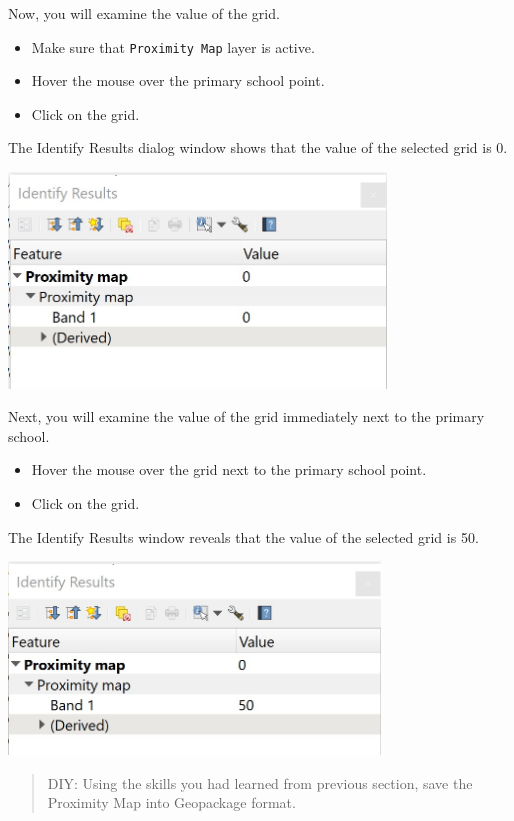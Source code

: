\documentclass[
  letterpaper,
  DIV=11,
  numbers=noendperiod]{scrreprt}
\providecommand{\tightlist}{%
  \setlength{\itemsep}{0pt}\setlength{\parskip}{0pt}}\usepackage{longtable,booktabs,array}
\begin{document}
Now, you will examine the value of the grid.

\begin{itemize}
\tightlist
\item
  Make sure that \texttt{Proximity\ Map} layer is active.
\item
  Hover the mouse over the primary school point.
\item
  Click on the grid.
\end{itemize}

The Identify Results dialog window shows that the value of the selected
grid is 0.

\includegraphics[width=3.94792in,height=\textheight]{./img06/image20.jpg}

Next, you will examine the value of the grid immediately next to the
primary school.

\begin{itemize}
\tightlist
\item
  Hover the mouse over the grid next to the primary school point.
\item
  Click on the grid.
\end{itemize}

The Identify Results window reveals that the value of the selected grid
is 50.

\includegraphics[width=3.88542in,height=\textheight]{./img06/image21.jpg}

\begin{quote}
DIY: Using the skills you had learned from previous section, save the
Proximity Map into Geopackage format.
\end{quote}
\end{document}
